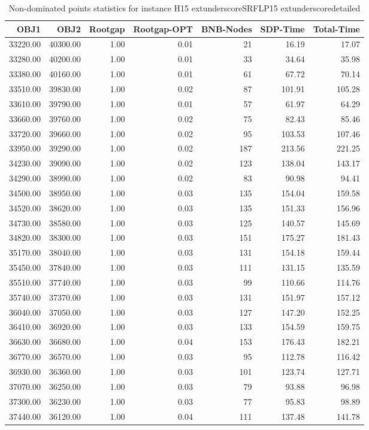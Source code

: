 \begin{table}
\caption{Non-dominated points statistics for instance H15	extunderscoreSRFLP15	extunderscoredetailed}
\label{tab:stats/H15_SRFLP15_detailed}
\begin{tabular}{rrrrrrr}
\toprule
OBJ1 & OBJ2 & Rootgap & Rootgap-OPT & BNB-Nodes & SDP-Time & Total-Time \\
\midrule
33220.00 & 40300.00 & 1.00 & 0.01 & 21 & 16.19 & 17.07 \\
33280.00 & 40200.00 & 1.00 & 0.01 & 33 & 34.64 & 35.98 \\
33380.00 & 40160.00 & 1.00 & 0.01 & 61 & 67.72 & 70.14 \\
33510.00 & 39830.00 & 1.00 & 0.02 & 87 & 101.91 & 105.28 \\
33610.00 & 39790.00 & 1.00 & 0.01 & 57 & 61.97 & 64.29 \\
33660.00 & 39760.00 & 1.00 & 0.02 & 75 & 82.43 & 85.46 \\
33720.00 & 39660.00 & 1.00 & 0.02 & 95 & 103.53 & 107.46 \\
33950.00 & 39290.00 & 1.00 & 0.02 & 187 & 213.56 & 221.25 \\
34230.00 & 39090.00 & 1.00 & 0.02 & 123 & 138.04 & 143.17 \\
34290.00 & 38990.00 & 1.00 & 0.02 & 83 & 90.98 & 94.41 \\
34500.00 & 38950.00 & 1.00 & 0.03 & 135 & 154.04 & 159.58 \\
34520.00 & 38620.00 & 1.00 & 0.03 & 135 & 151.33 & 156.96 \\
34730.00 & 38580.00 & 1.00 & 0.03 & 125 & 140.57 & 145.69 \\
34820.00 & 38300.00 & 1.00 & 0.03 & 151 & 175.27 & 181.43 \\
35170.00 & 38040.00 & 1.00 & 0.03 & 131 & 154.18 & 159.44 \\
35450.00 & 37840.00 & 1.00 & 0.03 & 111 & 131.15 & 135.59 \\
35510.00 & 37740.00 & 1.00 & 0.03 & 99 & 110.66 & 114.76 \\
35740.00 & 37370.00 & 1.00 & 0.03 & 131 & 151.97 & 157.12 \\
36040.00 & 37050.00 & 1.00 & 0.03 & 127 & 147.20 & 152.25 \\
36410.00 & 36920.00 & 1.00 & 0.03 & 133 & 154.59 & 159.75 \\
36630.00 & 36680.00 & 1.00 & 0.04 & 153 & 176.43 & 182.21 \\
36770.00 & 36570.00 & 1.00 & 0.03 & 95 & 112.78 & 116.42 \\
36930.00 & 36360.00 & 1.00 & 0.03 & 101 & 123.74 & 127.71 \\
37070.00 & 36250.00 & 1.00 & 0.03 & 79 & 93.88 & 96.98 \\
37300.00 & 36230.00 & 1.00 & 0.03 & 77 & 95.83 & 98.89 \\
37440.00 & 36120.00 & 1.00 & 0.04 & 111 & 137.48 & 141.78 \\
\bottomrule
\end{tabular}
\end{table}
